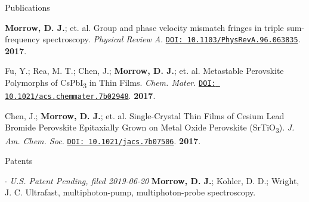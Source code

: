 \documentclass{resume} %
\begin{document}
\begin{rSection}{Publications}
\begin{etaremune}[topsep=0pt,itemsep=0pt,partopsep=0pt,parsep=0pt]
\item \textbf{Morrow, D. J.}; et. al. %
Group and phase velocity mismatch fringes in triple sum-frequency spectroscopy. \emph{Physical Review A}. \href{https://journals.aps.org/pra/abstract/10.1103/PhysRevA.96.063835}{\texttt{DOI: 10.1103/PhysRevA.96.063835}}. \textbf{2017}.

\item Fu, Y.; Rea, M. T.; Chen, J.; \textbf{Morrow, D. J.}; et. al. %
Metastable Perovskite Polymorphs of CsPbI\textsubscript{3} in Thin Films. \emph{Chem. Mater.} \href{http://pubs.acs.org/doi/10.1021/acs.chemmater.7b02948}{\texttt{DOI: 10.1021/acs.chemmater.7b02948}}. \textbf{2017}. 
 
\item Chen, J.; \textbf{Morrow, D. J.}; et. al. %
Single-Crystal Thin Films of Cesium Lead Bromide Perovskite Epitaxially Grown on Metal Oxide Perovskite (SrTiO\textsubscript{3}). \emph{J. Am. Chem. Soc.} \href{http://pubs.acs.org/doi/10.1021/jacs.7b07506}{\texttt{DOI: 10.1021/jacs.7b07506}}. \textbf{2017}. 
	



\end{etaremune}

\end{rSection}

\begin{rSection}{Patents}
	\begin{etaremune}
		\item[$\cdot$] \textit{U.S. Patent Pending, filed 2019-06-20} \textbf{Morrow, D. J.}; Kohler, D. D.; Wright, J. C. Ultrafast, multiphoton-pump, multiphoton-probe spectroscopy. 		
	\end{etaremune}	
\end{rSection}
\end{document}
